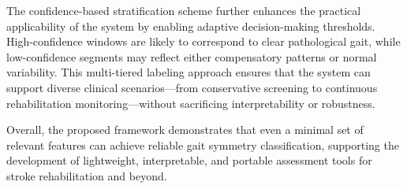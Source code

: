 The confidence-based stratification scheme further enhances the practical applicability of the system by enabling adaptive decision-making thresholds. 
High-confidence windows are likely to correspond to clear pathological gait, while low-confidence segments may reflect either compensatory patterns or normal 
variability. This multi-tiered labeling approach ensures that the system can support diverse clinical scenarios—from conservative screening to continuous 
rehabilitation monitoring—without sacrificing interpretability or robustness.
  
Overall, the proposed framework demonstrates that even a minimal set of relevant features can achieve reliable gait symmetry classification, 
supporting the development of lightweight, interpretable, and portable assessment tools for stroke rehabilitation and beyond.




